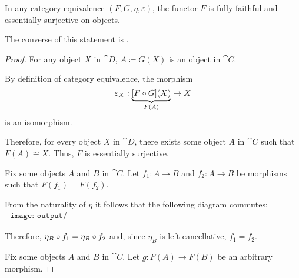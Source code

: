 \begin{proposition}\label{thm:equivalence_induces_fully_faithful_and_essentially_surjective_functor}
  In any \hyperref[def:category_equivalence]{category equivalence} \( (F, G, \eta, \varepsilon) \), the functor \( F \) is \hyperref[def:functor_invertibility/fully_faithful]{fully faithful} and \hyperref[def:functor_invertibility/surjective_on_objects]{essentially surjective on objects}.

  The converse of this statement is .
\end{proposition}
\begin{proof}
   For any object \( X \) in \( \cat{D} \), \( A \coloneqq G(X) \) is an object in \( \cat{C} \).

  By definition of category equivalence, the morphism
  \begin{equation*}
    \varepsilon_X: \underbrace{[F \bincirc G](X)}_{F(A)} \to X
  \end{equation*}
  is an isomorphism.

  Therefore, for every object \( X \) in \( \cat{D} \), there exists some object \( A \) in \( \cat{C} \) such that \( F(A) \cong X \). Thus, \( F \) is essentially surjective.

   Fix some objects \( A \) and \( B \) in \( \cat{C} \). Let \( f_1: A \to B \) and \( f_2: A \to B \) be morphisms such that \( F(f_1) = F(f_2) \).

  From the naturality of \( \eta \) it follows that the following diagram commutes:
  \begin{equation}\label{eq:thm:equivalence_induces_fully_faithful_and_essentially_surjective_functor/faithfullness}
    \begin{aligned}
      \texttt{[image: output/thm\_\_equivalence\_induces\_fully\_faithful\_and\_essentially\_surjective\_functor]}
    \end{aligned}
  \end{equation}

  Therefore, \( \eta_B \bincirc f_1 = \eta_B \bincirc f_2 \) and, since \( \eta_B \) is left-cancellative, \( f_1 = f_2 \).

   Fix some objects \( A \) and \( B \) in \( \cat{C} \). Let \( g: F(A) \to F(B) \) be an arbitrary morphism.


\end{proof}
